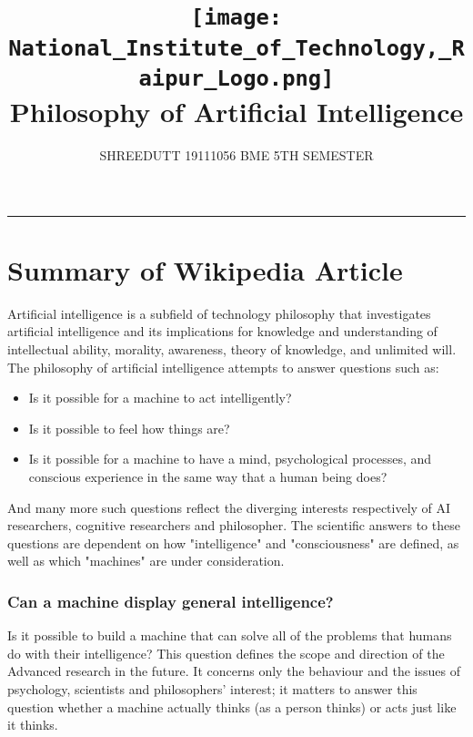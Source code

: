 \documentclass[13pt,letterpaper]{article}
\begin{document}
\title{
\texttt{[image: National\_Institute\_of\_Technology,\_Raipur\_Logo.png]}
\\ 
Philosophy of Artificial Intelligence
}

\author{SHREEDUTT 19111056 BME 5TH SEMESTER}

\maketitle
\rule{\textwidth}{0.5pt}
\nolinebreak[4]
\section*{Summary of Wikipedia Article}
Artificial intelligence is a subfield of technology philosophy that investigates artificial intelligence and its implications for knowledge and understanding of intellectual ability, morality, awareness, theory of knowledge, and unlimited will.
The philosophy of artificial intelligence attempts to answer questions such as:
\nolinebreak[4]
\begin{itemize}
  \item Is it possible for a machine to act intelligently?
  \item Is it possible to feel how things are?
  \item Is it possible for a machine to have a mind, psychological processes, and conscious experience in the same way that a human being does?
\end{itemize}
And many more such questions reflect the diverging interests respectively of AI researchers, cognitive researchers and philosopher. The scientific answers to these questions are dependent on how "intelligence" and "consciousness" are defined, as well as which "machines" are under consideration.\\
\subsubsection* {Can a machine display general intelligence?}
Is it possible to build a machine that can solve all of the problems that humans do with their intelligence? This question defines the scope and direction of the Advanced research in the future. It concerns only the behaviour and the issues of psychology,  scientists and philosophers' interest; it matters to answer this question whether a machine actually thinks (as a person thinks) or acts just like it thinks.
\nolinebreak[4]
\end{document}
